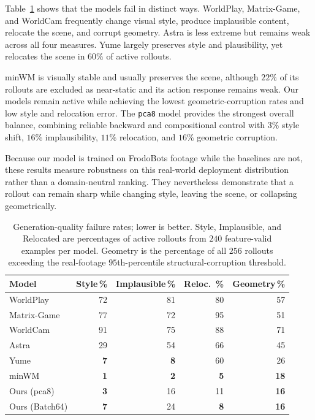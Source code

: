 \documentclass[letterpaper]{article} %
\begin{document}
Table~\ref{tab:quality_all} shows that the models fail in distinct ways.
WorldPlay, Matrix-Game, and WorldCam frequently change visual style, produce
implausible content, relocate the scene, and corrupt geometry. Astra is less
extreme but remains weak across all four measures. Yume largely preserves
style and plausibility, yet relocates the scene in $60\%$ of active rollouts.

minWM is visually stable and usually preserves the scene, although $22\%$ of
its rollouts are excluded as near-static and its action response remains weak.
Our models remain active while achieving the lowest geometric-corruption rates
and low style and relocation error. The \texttt{pca8} model provides the
strongest overall balance, combining reliable backward and compositional
control with $3\%$ style shift, $16\%$ implausibility, $11\%$ relocation, and
$16\%$ geometric corruption.

Because our model is trained on FrodoBots footage while the baselines are not,
these results measure robustness on this real-world deployment distribution
rather than a domain-neutral ranking. They nevertheless demonstrate that a
rollout can remain sharp while changing style, leaving the scene, or
collapsing geometrically.

\begin{table}[t]
\centering
\small
\setlength{\tabcolsep}{4pt}
\caption{
    Generation-quality failure rates; lower is better. Style,
    Implausible, and Relocated are percentages of active rollouts from
    $240$ feature-valid examples per model. Geometry is the percentage of
    all $256$ rollouts exceeding the real-footage $95$th-percentile
    structural-corruption threshold.
}
\label{tab:quality_all}
\begin{tabular}{lrrrr}
\toprule
Model & Style\,\% & Implausible\,\% & Reloc. \,\% & Geometry\,\% \\
\midrule
WorldPlay     & 72 & 81 & 80 & 57 \\
Matrix-Game   & 77 & 72 & 95 & 51 \\
WorldCam      & 91 & 75 & 88 & 71 \\
Astra         & 29 & 54 & 66 & 45 \\
Yume          & \textbf{7} & \textbf{8} & 60 & 26 \\
minWM         & \textbf{1} & \textbf{2} & \textbf{5} & \textbf{18} \\
Ours (pca8)   & \textbf{3} & 16 & 11 & \textbf{16} \\
Ours (Batch64)& \textbf{7} & 24 & \textbf{8} & \textbf{16} \\
\bottomrule
\end{tabular}
\end{table}
\end{document}
